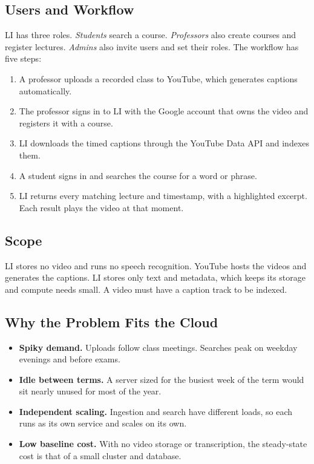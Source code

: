 \documentclass[conference]{IEEEtran}
\begin{document}
\subsection{Users and Workflow}
LI has three roles. \emph{Students} search a course. \emph{Professors}
also create courses and register lectures. \emph{Admins} also invite users
and set their roles. The workflow has five steps:
\begin{enumerate}
\item A professor uploads a recorded class to YouTube, which generates
captions automatically.
\item The professor signs in to LI with the Google account that owns the
video and registers it with a course.
\item LI downloads the timed captions through the YouTube Data API and
indexes them.
\item A student signs in and searches the course for a word or phrase.
\item LI returns every matching lecture and timestamp, with a highlighted
excerpt. Each result plays the video at that moment.
\end{enumerate}

\subsection{Scope}
LI stores no video and runs no speech recognition. YouTube hosts the
videos and generates the captions. LI stores only text and metadata, which
keeps its storage and compute needs small. A video must have a caption
track to be indexed.

\subsection{Why the Problem Fits the Cloud}
\begin{itemize}
\item \textbf{Spiky demand.} Uploads follow class meetings. Searches peak
on weekday evenings and before exams.
\item \textbf{Idle between terms.} A server sized for the busiest week of
the term would sit nearly unused for most of the year.
\item \textbf{Independent scaling.} Ingestion and search have different
loads, so each runs as its own service and scales on its own.
\item \textbf{Low baseline cost.} With no video storage or transcription,
the steady-state cost is that of a small cluster and database.
\end{itemize}
\end{document}
